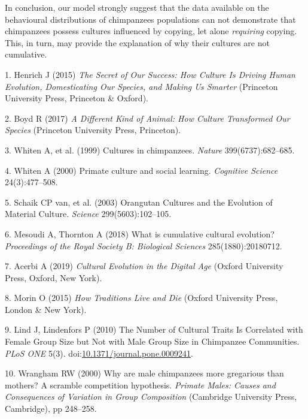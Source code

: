 \documentclass[9pt,twocolumn,twoside,]{pnas-new}
\begin{document}
In conclusion, our model strongly suggest that the data available on the
behavioural distributions of chimpanzees populations can not demonstrate
that chimpanzees possess cultures influenced by copying, let alone
\emph{requiring} copying. This, in turn, may provide the explanation of
why their cultures are not cumulative.

\showmatmethods
\showacknow
\pnasbreak

\hypertarget{refs}{}
\hypertarget{ref-henrich_secret_2015}{}
1. Henrich J (2015) \emph{The Secret of Our Success: How Culture Is
Driving Human Evolution, Domesticating Our Species, and Making Us
Smarter} (Princeton University Press, Princeton \& Oxford).

\hypertarget{ref-boyd_different_2017}{}
2. Boyd R (2017) \emph{A Different Kind of Animal: How Culture
Transformed Our Species} (Princeton University Press, Princeton).

\hypertarget{ref-whiten_cultures_1999}{}
3. Whiten A, et al. (1999) Cultures in chimpanzees. \emph{Nature}
399(6737):682--685.

\hypertarget{ref-whiten_primate_2000}{}
4. Whiten A (2000) Primate culture and social learning. \emph{Cognitive
Science} 24(3):477--508.

\hypertarget{ref-van_schaik_orangutan_2003}{}
5. Schaik CP van, et al. (2003) Orangutan Cultures and the Evolution of
Material Culture. \emph{Science} 299(5603):102--105.

\hypertarget{ref-mesoudi_what_2018}{}
6. Mesoudi A, Thornton A (2018) What is cumulative cultural evolution?
\emph{Proceedings of the Royal Society B: Biological Sciences}
285(1880):20180712.

\hypertarget{ref-acerbi_cultural_2019}{}
7. Acerbi A (2019) \emph{Cultural Evolution in the Digital Age} (Oxford
University Press, Oxford, New York).

\hypertarget{ref-morin_how_2015}{}
8. Morin O (2015) \emph{How Traditions Live and Die} (Oxford University
Press, London \& New York).

\hypertarget{ref-lind_number_2010}{}
9. Lind J, Lindenfors P (2010) The Number of Cultural Traits Is
Correlated with Female Group Size but Not with Male Group Size in
Chimpanzee Communities. \emph{PLoS ONE} 5(3).
doi:\href{https://doi.org/10.1371/journal.pone.0009241}{10.1371/journal.pone.0009241}.

\hypertarget{ref-wrangham_why_2000}{}
10. Wrangham RW (2000) Why are male chimpanzees more gregarious than
mothers? A scramble competition hypothesis. \emph{Primate Males: Causes
and Consequences of Variation in Group Composition} (Cambridge
University Press, Cambridge), pp 248--258.
\end{document}
